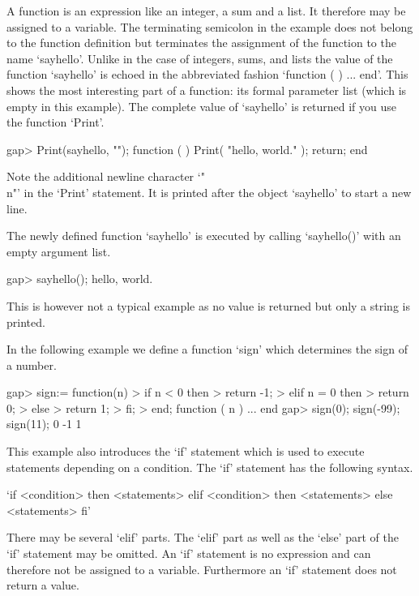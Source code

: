 A {\GAP} function is an expression like an integer, a sum and a list.  It
therefore  may be assigned to a  variable.   The terminating semicolon in
the example does not belong to the function definition but terminates the
assignment of the function to the name `sayhello'.  Unlike in the case of
integers, sums, and lists the value  of the function `sayhello' is echoed
in the abbreviated fashion `function ( )  ...  end'.  This shows the most
interesting part of a function: its formal parameter list (which is empty
in this example).  The  complete value of `sayhello'  is returned if  you
use the function `Print'.

\beginexample
gap> Print(sayhello, "\n");
function (  )
    Print( "hello, world.\n" );
    return;
end
\endexample

Note the  additional newline character  `"\\n"' in the `Print' statement.
It is printed after the object `sayhello' to start a new line.

The newly defined function `sayhello' is executed by calling `sayhello()'
with an empty argument list.

\beginexample
gap> sayhello();
hello, world.
\endexample

This is however not a typical example as no  value is returned but only a
string is printed.


In the following example we define a function `sign' which determines
the sign of a number.

\beginexample
gap> sign:= function(n)
>        if n < 0 then
>           return -1;
>        elif n = 0 then
>           return 0;
>        else
>           return 1;
>        fi;
>    end;
function ( n ) ... end
gap> sign(0); sign(-99); sign(11);
0
-1
1
\endexample

This example also introduces the `if' statement which is  used to execute
statements  depending  on  a  condition.   The  `if'  statement  has  the
following syntax.

\fmark`if <condition> then
    <statements>
elif <condition> then
    <statements>
else
    <statements>
fi'

There may be several `elif' parts.  The `elif' part as well as the `else'
part  of the  `if' statement may be omitted.   An  `if'  statement  is no
expression and  can therefore not be assigned to a variable.  Furthermore
an `if' statement does not return a value.

